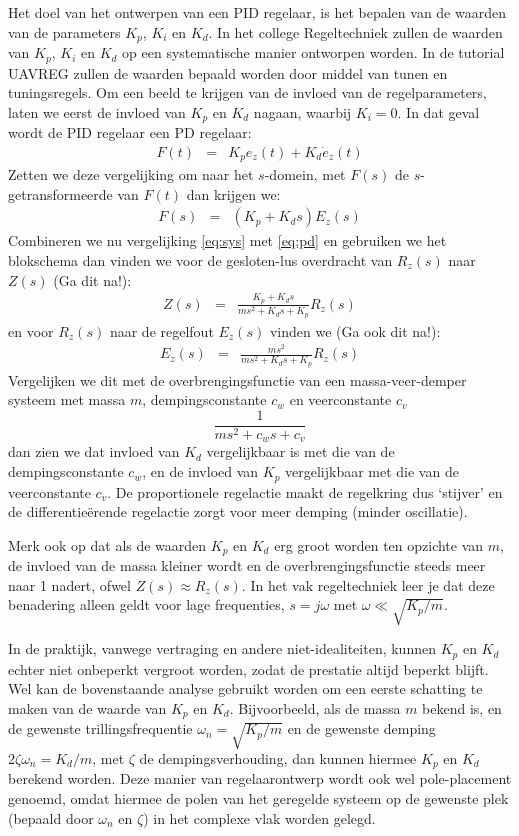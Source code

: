 \documentclass[a4paper,11pt]{article}
\begin{document}
Het doel van het ontwerpen van een PID regelaar, is het
bepalen van de waarden van de parameters $K_p$, $K_i$ en $K_d$. In het college
Regeltechniek zullen de waarden van $K_p$, $K_i$ en $K_d$ op een systematische
manier ontworpen worden. In de tutorial UAVREG zullen de waarden bepaald
worden door middel van tunen en tuningsregels. Om een beeld
te krijgen van de invloed van de regelparameters, laten we eerst de invloed
van $K_p$ en $K_d$ nagaan, waarbij $K_i=0$. In dat geval wordt de  PID
regelaar een PD regelaar:
\begin{eqnarray}
  F(t) & = & K_p e_z(t)  + K_d \dot{e}_z(t)
\end{eqnarray}
Zetten we deze vergelijking om naar het $s$-domein, met $F(s)$ de
$s$-getransformeerde van $F(t)$ dan krijgen we:
\begin{eqnarray}
  \label{eq:pd}
  F(s) & = & (K_p + K_d s ) E_z(s) 
\end{eqnarray}
Combineren we nu vergelijking \eqref{eq:sys} met \eqref{eq:pd} en gebruiken we
het blokschema \label{fig:blokschema_hoogte} dan vinden we
voor de gesloten-lus overdracht van $R_z(s)$ naar $Z(s)$ (Ga dit na!):
\begin{eqnarray}
  Z(s) & = & \frac{K_p + K_d s}{ms^2 + K_ds + K_p}  R_z(s)
\end{eqnarray}
en voor $R_z(s)$ naar de regelfout $E_z(s)$ vinden we (Ga ook dit na!):
\begin{eqnarray}
  E_z(s) & = & \frac{ms^2}{ms^2 + K_ds + K_p}  R_z(s)
\end{eqnarray}
Vergelijken we dit met de overbrengingsfunctie van een massa-veer-demper
systeem met massa $m$, dempingsconstante $c_w$ en veerconstante $c_v$
\[
  \frac{1}{ms^2 + c_w s + c_v}
\]
dan zien we dat invloed van $K_d$ vergelijkbaar is met die van de
dempingsconstante $c_w$, en de invloed van $K_p$ vergelijkbaar met die van de
veerconstante $c_v$. De proportionele regelactie maakt de regelkring dus
`stijver' en de differentie\"erende regelactie zorgt voor meer demping (minder
oscillatie).

Merk ook op dat als de waarden $K_p$ en $K_d$ erg groot worden ten opzichte
van $m$, de invloed van de massa
kleiner wordt en de overbrengingsfunctie steeds meer naar 1 nadert, ofwel
$Z(s)\approx R_z(s)$. In het vak regeltechniek leer je dat deze benadering
alleen geldt voor lage frequenties, $s=j\omega$ met $\omega\ll \sqrt{K_p/m}$. 

In de praktijk, vanwege vertraging en andere niet-idealiteiten, kunnen $K_p$
en $K_d$ echter niet onbeperkt vergroot worden, zodat de prestatie altijd
beperkt blijft. Wel kan de bovenstaande analyse gebruikt worden om een eerste
schatting te maken van de waarde van $K_p$ en $K_d$. Bijvoorbeeld, als de
massa $m$ bekend is, en de gewenste trillingsfrequentie
$\omega_n=\sqrt{K_p/m}$ en de gewenste demping $2\zeta \omega_n = K_d/m$, met
$\zeta$ de dempingsverhouding, dan kunnen hiermee $K_p$ en $K_d$ berekend
worden. Deze manier van regelaarontwerp wordt ook wel pole-placement genoemd,
omdat hiermee de polen van het geregelde systeem op de gewenste plek (bepaald
door $\omega_n$ en $\zeta$) in het complexe vlak worden gelegd.
\end{document}
